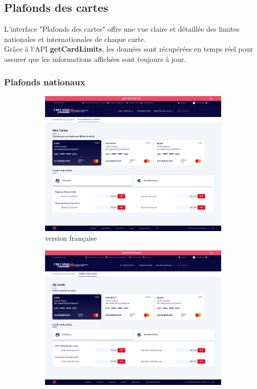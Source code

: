 \subsection{Plafonds des cartes}
L'interface "Plafonds des cartes" offre une vue claire et détaillée des limites nationales et internationales de chaque carte.\\

Grâce à l'API \textbf{getCardLimits}, les données sont récupérées en temps réel pour assurer que les informations affichées sont toujours à jour.
\newpage
\subsubsection*{Plafonds nationaux}
\begin{figure}[!ht]
    \centering
    \begin{subfigure}[b]{0.49\textwidth}
        \centering
        \includegraphics[width=\textwidth]{images/screens/plafondsNat/desktop.png}
        \caption{version française}
    \end{subfigure}
    \hfill
    \begin{subfigure}[b]{0.49\textwidth}
        \centering
        \includegraphics[width=\textwidth]{images/screens/limitsnat/desktop.png}

\end{subfigure}
\end{figure}

